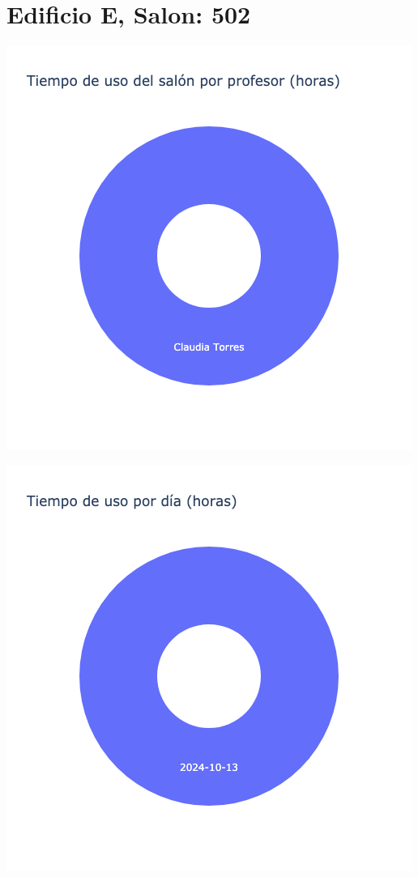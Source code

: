 \documentclass{article}
\begin{document}
    \section{Edificio E, Salon: 502}
    \noindent
    \begin{minipage}{0.48\textwidth}
        \centering
        \includegraphics[width=\textwidth]{../img/pie/UP502-90Dias-03-12-2024.png}
    \end{minipage}
    \hfill
    \begin{minipage}{0.48\textwidth}
        \centering
        \includegraphics[width=\textwidth]{../img/pie/UD502-90Dias-03-12-2024.png}
    \end{minipage}
    
\end{document}
